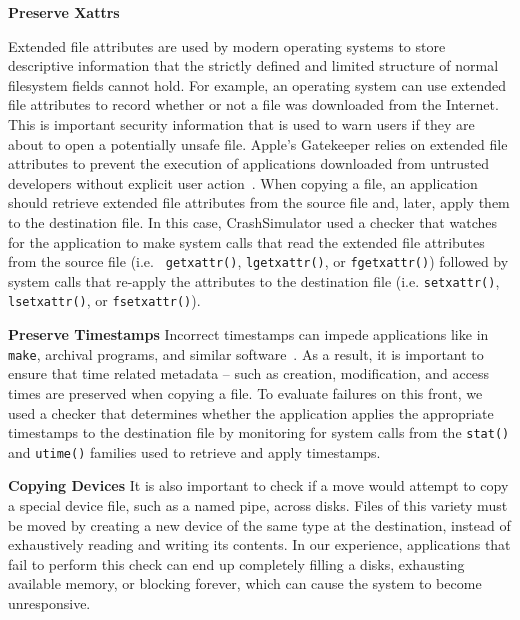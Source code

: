 {\bf Preserve Xattrs}

Extended file attributes
are used by modern operating systems
to store descriptive information
that the strictly defined and limited structure
of normal filesystem fields cannot hold.
For example,
an operating system can use extended file attributes
to record whether or not a file was downloaded from the Internet.
This is important security information
that is used to warn users
if they are about to open a potentially unsafe file.
Apple's Gatekeeper relies on extended file attributes
to prevent the execution of applications downloaded from
untrusted developers without explicit user action~\cite{AppleCodeSigning}.
When copying a file,
an application should retrieve extended file attributes from the source
file and, later, apply them to the destination file.
In this case, CrashSimulator used a checker
that watches for the application to make system calls
that read the extended file attributes from the source file (i.e. {\tt
  getxattr()}, {\tt lgetxattr()}, or {\tt fgetxattr()}) followed by system calls
that re-apply the attributes to the destination file (i.e. {\tt setxattr()},
{\tt lsetxattr()}, or {\tt fsetxattr()}).

{\bf Preserve Timestamps}
Incorrect timestamps can impede applications like
in {\tt make}, archival programs, and similar
software~\cite{NautilusTimestamps, SudoTimestamp}.
As a result, it is important to ensure
that time related metadata --
such as creation, modification, and access times
are preserved when copying a file.
To evaluate failures on this front,
we used a checker that determines
whether the application applies
the appropriate timestamps to the destination file
by monitoring for system calls from the {\tt stat()}
and {\tt utime()} families used to retrieve and apply timestamps.

{\bf Copying Devices}
It is also important to check if a move
would attempt to copy a special
device file, such as a named pipe, across disks.
Files of this variety must be moved
by creating a new device of the same type at the destination,
instead of exhaustively reading and writing its contents.
In our experience, applications that fail to perform this check
can end up completely filling a disks, exhausting available memory,
or blocking forever, which can cause the system to become unresponsive.


